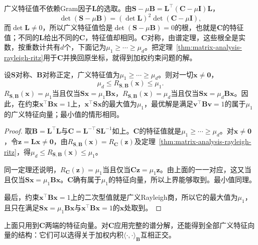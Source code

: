 广义特征值不依赖Gram因子$\bm L$的选取。由$\bm S-\mu\bm B=\bm L^\top(\bm C-\mu\bm I)\bm L$，
\[
 \det(\bm S-\mu\bm B)=(\det\bm L)^2\det(\bm C-\mu\bm I),
\]
而$\det\bm L\neq0$，所以广义特征值恰是$\det(\bm S-\mu\bm B)=0$的根，也就是$\bm C$的特征值；不同的$\bm L$给出不同的$\bm C$，特征值却相同。$\bm C$对称，由谱定理，这些根全是实数，按重数计共有$d$个，下面记为$\mu_1\geq\cdots\geq\mu_d$。把定理~\ref{thm:matrix-analysis-rayleigh-ritz}用于$\bm C$并换回原坐标，就得到加权约束问题的解。

\begin{theorem}[广义Rayleigh商的极值]
\label{thm:ls-generalized-rayleigh-extremal}
设$\bm S$对称、$\bm B$对称正定，广义特征值为$\mu_1\geq\cdots\geq\mu_d$。则对一切$\bm x\neq\bm0$，
\[
 \mu_d\leq R_{\bm S,\bm B}(\bm x)\leq\mu_1 .
\]
$R_{\bm S,\bm B}(\bm x)=\mu_1$当且仅当$\bm S\bm x=\mu_1\bm B\bm x$，$R_{\bm S,\bm B}(\bm x)=\mu_d$当且仅当$\bm S\bm x=\mu_d\bm B\bm x$。因此，在约束$\bm x^\top\bm B\bm x=1$上，$\bm x^\top\bm S\bm x$的最大值为$\mu_1$，最优解是满足$\bm v^\top\bm B\bm v=1$的属于$\mu_1$的广义特征向量；最小值的情形相同。
\end{theorem}
\begin{proof}
取$\bm B=\bm L^\top\bm L$与$\bm C=\bm L^{-\top}\bm S\bm L^{-1}$如上。$\bm C$的特征值就是$\mu_1\geq\cdots\geq\mu_d$。对$\bm x\neq\bm0$，令$\bm z=\bm L\bm x\neq\bm0$，由$R_{\bm S,\bm B}(\bm x)=R_{\bm C}(\bm z)$及定理~\ref{thm:matrix-analysis-rayleigh-ritz}，得$\mu_d\leq R_{\bm S,\bm B}(\bm x)\leq\mu_1$。

同一定理还说明，$R_{\bm C}(\bm z)=\mu_1$当且仅当$\bm C\bm z=\mu_1\bm z$。由上面的一一对应，这又当且仅当$\bm S\bm x=\mu_1\bm B\bm x$。$\bm C$确有属于$\mu_1$的特征向量，所以上界能够取到。最小值同理。

最后，约束$\bm x^\top\bm B\bm x=1$上的二次型值就是广义Rayleigh商，所以它的最大值为$\mu_1$，且只在满足$\bm S\bm x=\mu_1\bm B\bm x$与$\bm x^\top\bm B\bm x=1$的$\bm x$处取到。
\end{proof}

上面只用到$\bm C$两端的特征向量。对$\bm C$应用完整的谱分解，还能得到全部广义特征向量的结构：它们可以选得关于加权内积$\langle\cdot,\cdot\rangle_{\bm B}$互相正交。

